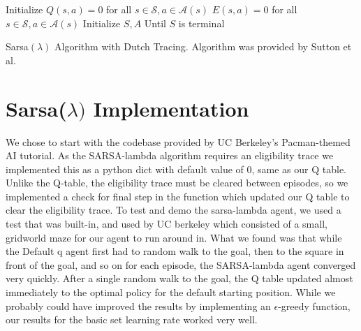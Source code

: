 \documentclass[10pt,conference]{IEEEtran}
\begin{document}
	\begin{algorithm}
		\DontPrintSemicolon
		Initialize \(Q(s,a) = 0\) for all \(s \in \mathcal{S}, a \in \mathcal{A}(s)\)\;
		 {
			\(E(s, a) = 0\) for all \(s \in \mathcal{S}, a \in \mathcal{A}(s)\)\;
			Initialize \(S,A\)\;
			Until \(S\) is terminal\;
		}
		\caption{Sarsa\((\lambda)\) Algorithm with Dutch Tracing.  Algorithm
		was provided by Sutton et al. \cite{sutton18}}
		\label{sarsa}
	\end{algorithm}

\section{Sarsa(\(\lambda)\) Implementation}
\label{sec:implementation}

	We chose to start with the codebase provided by UC Berkeley’s Pacman-themed AI 
	tutorial. As the SARSA-lambda algorithm requires an eligibility trace we 
	implemented this as a python dict with default value of 0, same as our Q table. 
	Unlike the Q-table, the eligibility trace must be cleared between episodes, 
	so we implemented a check for final step in the function which updated our 
	Q table to clear the eligibility trace.
    To test and demo the sarsa-lambda agent, we used a test that was built-in, 
	and used by UC berkeley which consisted of a small, gridworld maze for our 
	agent to run around in. What we found was that while the Default q agent 
	first had to random walk to the goal, then to the square in front of the 
	goal, and so on for each episode, the SARSA-lambda agent converged very 
	quickly. After a single random walk to the goal, the Q table updated almost 
	immediately to the optimal policy for the default starting position. While 
	we probably could have improved the results by implementing an 
	\(\epsilon\)-greedy function, our results for the basic set learning rate 
	worked very well.
\end{document}
